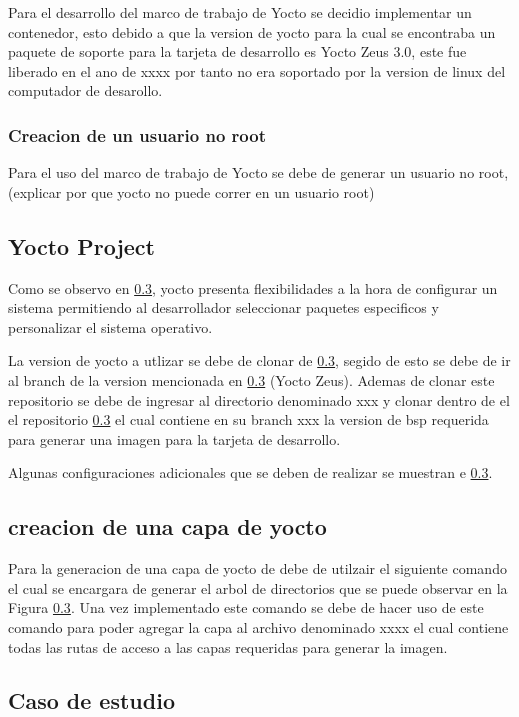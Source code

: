 Para el desarrollo del marco de trabajo de Yocto se decidio implementar un contenedor, esto debido a que la version de yocto para la cual se encontraba un paquete de soporte para la tarjeta de desarrollo es Yocto Zeus 3.0, este fue liberado en el ano de xxxx por tanto no era soportado por la version de linux del computador de desarollo. 

\subsubsection{Creacion de un usuario no root}

Para el uso del marco de trabajo de Yocto se debe de generar un usuario no root, (explicar por que yocto no puede correr en un usuario root)

\subsection{Yocto Project}

Como se observo en \ref{}, yocto presenta flexibilidades a la hora de configurar un sistema permitiendo al desarrollador seleccionar paquetes especificos y personalizar el sistema operativo.

La version de yocto a utlizar se debe de clonar de \ref{}, segido de esto se debe de ir al branch de la version mencionada en \ref{} (Yocto Zeus). Ademas de clonar este repositorio se debe de ingresar al directorio denominado xxx y clonar dentro de el el repositorio \ref{} el cual contiene en su branch xxx la version de bsp requerida para generar una imagen para la tarjeta de desarrollo.


Algunas configuraciones adicionales que se deben de realizar se muestran e \ref{}.

\subsection{creacion de una capa de yocto}

Para la generacion de una capa de yocto de debe de utilzair el siguiente comando el cual se encargara de generar el arbol de directorios que se puede observar en la Figura \ref{}. Una vez implementado este comando se debe de hacer uso de este comando para poder agregar la capa al archivo denominado xxxx el cual contiene todas las rutas de acceso a las capas requeridas para generar la imagen.

\subsection{Caso de estudio}

